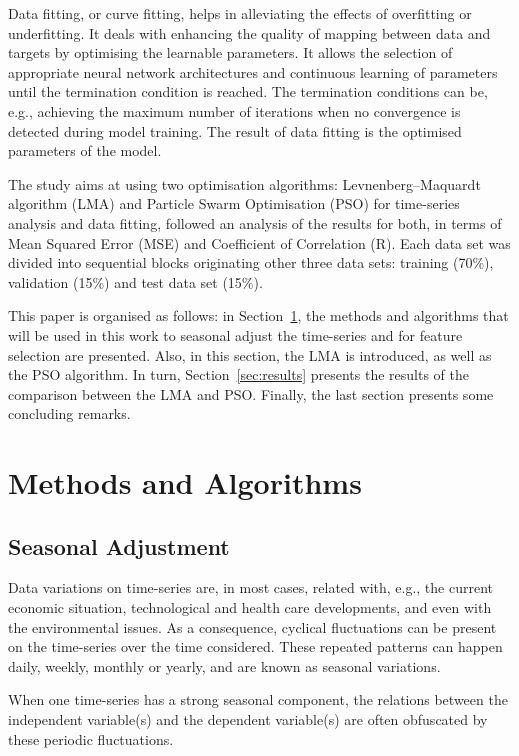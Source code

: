 Data fitting, or curve fitting, helps in alleviating the effects of overfitting or underfitting. It deals with enhancing the quality of mapping between data and targets by optimising the learnable parameters. It allows the selection of appropriate neural network architectures and continuous learning of parameters until the termination condition is reached. The termination conditions can be, e.g., achieving the maximum number of iterations when no convergence is detected during model training. The result of data fitting is the optimised parameters of the model. 

The study aims at using two optimisation algorithms: Levnenberg--Maquardt algorithm (LMA) and Particle Swarm Optimisation (PSO) for time-series analysis and data fitting, followed an analysis of the results for both, in terms of Mean Squared Error (MSE) and Coefficient of Correlation (R). Each data set was divided into sequential blocks originating other three data sets: training (70\%), validation (15\%) and test data set (15\%).

This paper is organised as follows: in Section~\ref{sec:methods}, the methods and algorithms that will be used in this work to seasonal adjust the time-series and for feature selection are presented. Also, in this section, the LMA is introduced, as well as the PSO algorithm. In turn, Section~\ref{sec:results} presents the results of the comparison between the LMA and PSO. Finally, the last section presents some concluding remarks. 

\section{Methods and Algorithms} \label{sec:methods} 

\subsection{Seasonal Adjustment}

Data variations on time-series are, in most cases, related with, e.g., the current economic situation, technological and health care developments, and even with the environmental issues. As a consequence, cyclical fluctuations can be present on the time-series over the time considered. These repeated patterns can happen daily, weekly, monthly or yearly, and are known as seasonal variations.

When one time-series has a strong seasonal component, the relations between the independent variable(s) and the dependent variable(s) are often obfuscated by these periodic fluctuations.

